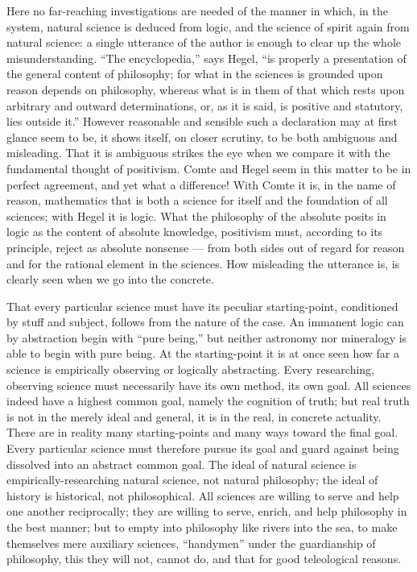 \documentclass[12pt]{book}
\begin{document}
Here no far-reaching investigations are needed of the manner in which, in the
system, natural science is deduced from logic, and the science of spirit again
from natural science: a single utterance of the author is enough to clear up the
whole misunderstanding. ``The encyclopedia,'' says Hegel, ``is properly a
presentation of the general content of philosophy; for what in the sciences is
grounded upon reason depends on philosophy, whereas what is in them of that
which rests upon arbitrary and outward determinations, or, as it is said, is
positive and statutory, lies outside it.'' However reasonable and sensible such a
declaration may at first glance seem to be, it shows itself, on closer scrutiny,
to be both ambiguous and misleading. That it is ambiguous strikes the eye when
we compare it with the fundamental thought of positivism. Comte and Hegel seem
in this matter to be in perfect agreement, and yet what a difference! With Comte
it is, in the name of reason, mathematics that is both a science for itself and
the foundation of all sciences; with Hegel it is logic. What the philosophy of
the absolute posits in logic as the content of absolute knowledge, positivism
must, according to its principle, reject as absolute nonsense --- from both sides
out of regard for reason and for the rational element in the sciences. How
misleading the utterance is, is clearly seen when we go into the concrete.

That every particular science must have its peculiar starting-point, conditioned
by stuff and subject, follows from the nature of the case. An immanent logic can
by abstraction begin with ``pure being,'' but neither astronomy nor mineralogy is
able to begin with pure being. At the starting-point it is at once seen how far a
science is empirically observing or logically abstracting. Every researching,
observing science must necessarily have its own method, its own goal. All
sciences indeed have a highest common goal, namely the cognition of truth; but
real truth is not in the merely ideal and general, it is in the real, in concrete
actuality. There are in reality many starting-points and many ways toward the
final goal. Every particular science must therefore pursue its goal and guard
against being dissolved into an abstract common goal. The ideal of natural
science is empirically-researching natural science, not natural philosophy; the
ideal of history is historical, not philosophical. All sciences are willing to
serve and help one another reciprocally; they are willing to serve, enrich, and
help philosophy in the best manner; but to empty into philosophy like rivers
into the sea, to make themselves mere auxiliary sciences, ``handymen'' under the
guardianship of philosophy, this they will not, cannot do, and that for good
teleological reasons.
\end{document}

